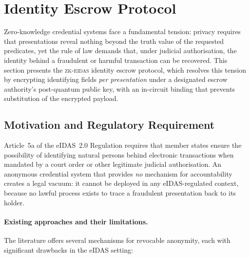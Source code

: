 \section{Identity Escrow Protocol}\label{sec:escrow}

Zero-knowledge credential systems face a fundamental tension:
privacy requires that presentations reveal nothing beyond the truth
value of the requested predicates, yet the rule of law demands that,
under judicial authorisation, the identity behind a fraudulent or
harmful transaction can be recovered.
This section presents the \textsc{zk-eidas} identity escrow protocol,
which resolves this tension by encrypting identifying fields
\emph{per presentation} under a designated escrow authority's
post-quantum public key, with an in-circuit binding that
prevents substitution of the encrypted payload.

\subsection{Motivation and Regulatory Requirement}\label{sec:escrow-motivation}

Article~5a of the eIDAS~2.0 Regulation requires that member states
ensure the possibility of identifying natural persons behind
electronic transactions when mandated by a court order or other
legitimate judicial authorisation.  An anonymous credential system
that provides \emph{no} mechanism for accountability creates a legal
vacuum: it cannot be deployed in any eIDAS-regulated context, because
no lawful process exists to trace a fraudulent presentation back to
its holder.

\paragraph{Existing approaches and their limitations.}
The literature offers several mechanisms for revocable anonymity, each
with significant drawbacks in the eIDAS setting:

